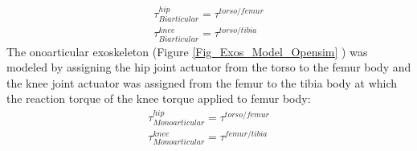 \documentclass[10pt,letterpaper]{article}
\begin{document}
\begin{align}\label{Eqn_Biarticular_Torque_Act}
\tau^{hip}_{Biarticular} = \tau^{torso/femur}\\
\tau^{knee}_{Biarticular} = \tau^{torso/tibia}
\end{align}
The onoarticular exoskeleton (Figure \ref{Fig_Exos_Model_Opensim} ) was modeled by assigning the hip joint actuator from the torso to the femur body and the knee joint actuator was assigned from the femur to the tibia body at which the reaction torque of the knee torque applied to femur body:
\begin{align}\label{Eqn_Monoarticular_Torque_Act}
\tau^{hip}_{Monoarticular} = \tau^{torso/femur}\\
\tau^{knee}_{Monoarticular} = \tau^{femur/tibia}
\end{align}
\end{document}
